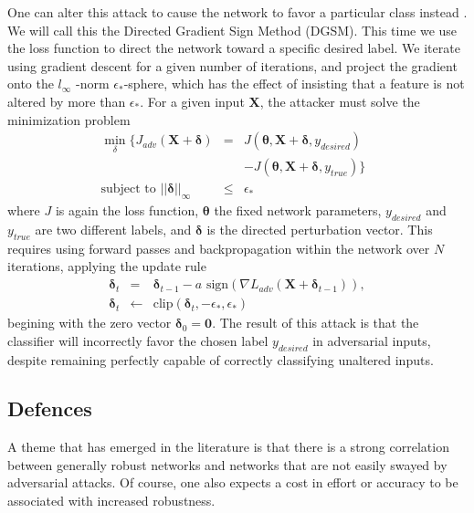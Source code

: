 \documentclass[conference]{IEEEtran}
\begin{document}
One can alter this attack to cause the network to favor a particular class
instead \cite{madry2020adversarial}. We will call this the Directed Gradient
Sign Method (DGSM). This time we use the loss function to direct the network
toward a specific desired label. We iterate using gradient descent for a
given number of iterations, and project the gradient onto the $l_{\infty }$%
-norm $\epsilon _{\ast }$-sphere, which has the effect of insisting that a
feature is not altered by more than $\epsilon _{\ast }$. For a given input $%
\mathbf{X}$, the attacker must solve the minimization problem 
\begin{eqnarray*}
\min_{\delta }\{J_{adv}(\mathbf{X}+\mathbf{\delta }) &=&J(\mathbf{\theta },%
\mathbf{X}+\mathbf{\delta },y_{desired}) \\
&&-J(\mathbf{\theta },\mathbf{X}+\mathbf{\delta },y_{true})\}\text{ } \\
\text{subject to }\left\vert \left\vert \mathbf{\delta }\right\vert
\right\vert _{\infty } &\leq &\epsilon _{\ast }
\end{eqnarray*}%
where $J$ is again the loss function, $\mathbf{\theta }$ the fixed network
parameters, $y_{desired}$ and $y_{true}$ are two different labels, and $%
\mathbf{\delta }$ is the directed perturbation vector. This requires using
forward passes and backpropagation within the network over $N$ iterations,
applying the update rule%
\begin{eqnarray*}
\mathbf{\delta }_{t} &=&\mathbf{\delta }_{t-1}-a\text{ sign}(\nabla L_{adv}(%
\mathbf{X}+\mathbf{\delta }_{t-1})), \\
\mathbf{\delta }_{t} &\leftarrow &\text{clip}(\mathbf{\delta }_{t},-\epsilon
_{\ast },\epsilon _{\ast })
\end{eqnarray*}%
begining with the zero vector $\mathbf{\delta }_{0}=\mathbf{0}$. The result
of this attack is that the classifier will incorrectly favor the chosen
label $y_{desired}$ in adversarial inputs, despite remaining perfectly
capable of correctly classifying unaltered inputs. 

\subsection{Defences}

A theme that has emerged in the literature is that there is a strong
correlation between generally robust networks and networks that are not
easily swayed by adversarial attacks. Of course, one also expects a cost in
effort or accuracy to be associated with increased robustness. 
\end{document}
